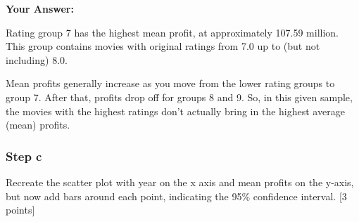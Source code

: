 \documentclass[
]{article}
\begin{document}
\textbf{Your Answer:}

Rating group 7 has the highest mean profit, at approximately 107.59
million. This group contains movies with original ratings from 7.0 up to
(but not including) 8.0.

Mean profits generally increase as you move from the lower rating groups
to group 7. After that, profits drop off for groups 8 and 9. So, in this
given sample, the movies with the highest ratings don't actually bring
in the highest average (mean) profits.

\subsubsection{Step c}\label{step-c-3}

Recreate the scatter plot with year on the x axis and mean profits on
the y-axis, but now add bars around each point, indicating the 95\%
confidence interval. {[}3 points{]}
\end{document}
